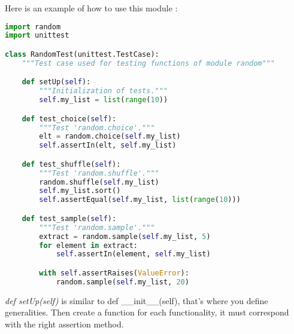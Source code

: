 \documentclass[a4paper, 12pt, titlepage]{scrartcl} %
\begin{document}
\vspace{5mm}

Here is an example of how to use this module :
\begin{lstlisting}[language=Python]
import random
import unittest

class RandomTest(unittest.TestCase):
    """Test case used for testing functions of module random"""

    def setUp(self):
        """Initialization of tests."""
        self.my_list = list(range(10))

    def test_choice(self):
        """Test 'random.choice'."""
        elt = random.choice(self.my_list)
        self.assertIn(elt, self.my_list)

    def test_shuffle(self):
        """Test 'random.shuffle'."""
        random.shuffle(self.my_list)
        self.my_list.sort()
        self.assertEqual(self.my_list, list(range(10)))

    def test_sample(self):
        """Test 'random.sample'."""
        extract = random.sample(self.my_list, 5)
        for element in extract:
            self.assertIn(element, self.my_list)

        with self.assertRaises(ValueError):
            random.sample(self.my_list, 20)
\end{lstlisting} \vspace{5mm}

\textit{def setUp(self)} is similar to def \_\_init\_\_(self), that's where you define generalities.
Then create a function for each functionality, it must correspond with the right assertion method.

\vspace{5mm}
\end{document}

